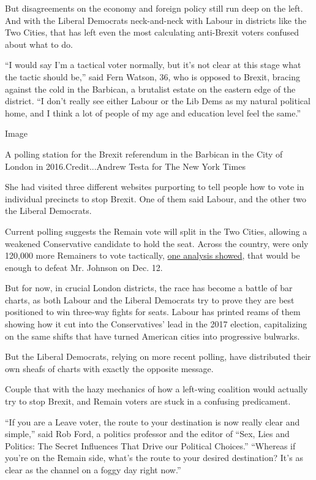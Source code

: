 But disagreements on the economy and foreign policy still run deep on
the left. And with the Liberal Democrats neck-and-neck with Labour in
districts like the Two Cities, that has left even the most calculating
anti-Brexit voters confused about what to do.

``I would say I'm a tactical voter normally, but it's not clear at this
stage what the tactic should be,'' said Fern Watson, 36, who is opposed
to Brexit, bracing against the cold in the Barbican, a brutalist estate
on the eastern edge of the district. ``I don't really see either Labour
or the Lib Dems as my natural political home, and I think a lot of
people of my age and education level feel the same.''

Image

A polling station for the Brexit referendum in the Barbican in the City
of London in 2016.Credit...Andrew Testa for The New York Times

She had visited three different websites purporting to tell people how
to vote in individual precincts to stop Brexit. One of them said Labour,
and the other two the Liberal Democrats.

Current polling suggests the Remain vote will split in the Two Cities,
allowing a weakened Conservative candidate to hold the seat. Across the
country, were only 120,000 more Remainers to vote tactically,
\href{https://www.bestforbritain.org/new_tactical_voting_recommendations_updated_mrp_polling}{one
analysis showed}, that would be enough to defeat Mr. Johnson on Dec. 12.

But for now, in crucial London districts, the race has become a battle
of bar charts, as both Labour and the Liberal Democrats try to prove
they are best positioned to win three-way fights for seats. Labour has
printed reams of them showing how it cut into the Conservatives' lead in
the 2017 election, capitalizing on the same shifts that have turned
American cities into progressive bulwarks.

But the Liberal Democrats, relying on more recent polling, have
distributed their own sheafs of charts with exactly the opposite
message.

Couple that with the hazy mechanics of how a left-wing coalition would
actually try to stop Brexit, and Remain voters are stuck in a confusing
predicament.

``If you are a Leave voter, the route to your destination is now really
clear and simple,'' said Rob Ford, a politics professor and the editor
of ``Sex, Lies and Politics: The Secret Influences That Drive our
Political Choices.'' ``Whereas if you're on the Remain side, what's the
route to your desired destination? It's as clear as the channel on a
foggy day right now.''

